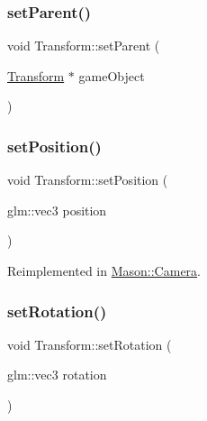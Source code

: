 \subsubsection{\texorpdfstring{set\+Parent()}{setParent()}}
{\footnotesize\ttfamily void Transform\+::set\+Parent (\begin{DoxyParamCaption}\item[{\hyperlink{class_mason_1_1_transform}{Transform} $\ast$}]{game\+Object }\end{DoxyParamCaption})\hspace{0.3cm}{\ttfamily [virtual]}}

\hypertarget{class_mason_1_1_transform_a740f389e20c0190c52bcb893aeaa0490}{}\label{class_mason_1_1_transform_a740f389e20c0190c52bcb893aeaa0490} 
\subsubsection{\texorpdfstring{set\+Position()}{setPosition()}}
{\footnotesize\ttfamily void Transform\+::set\+Position (\begin{DoxyParamCaption}\item[{glm\+::vec3}]{position }\end{DoxyParamCaption})\hspace{0.3cm}{\ttfamily [virtual]}}



Reimplemented in \hyperlink{class_mason_1_1_camera_a69f184af46d081b85209040bbe814cbb}{Mason\+::\+Camera}.

\hypertarget{class_mason_1_1_transform_aacc2b668bdd1d9b978aa0edccf75144a}{}\label{class_mason_1_1_transform_aacc2b668bdd1d9b978aa0edccf75144a} 
\subsubsection{\texorpdfstring{set\+Rotation()}{setRotation()}}
{\footnotesize\ttfamily void Transform\+::set\+Rotation (\begin{DoxyParamCaption}\item[{glm\+::vec3}]{rotation }\end{DoxyParamCaption})\hspace{0.3cm}{\ttfamily [virtual]}}

